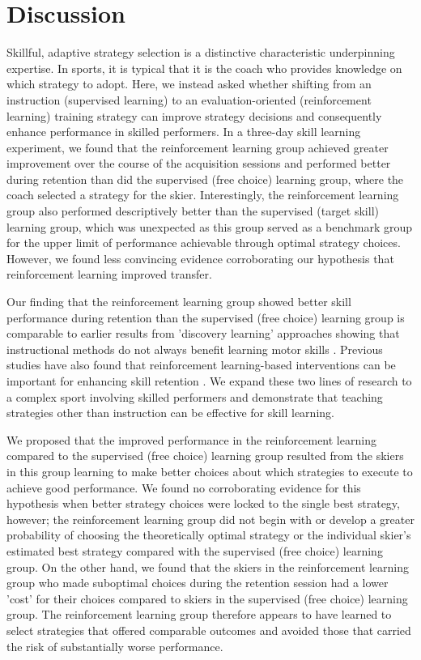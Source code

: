 \documentclass[pdflatex,sn-nature]{sn-jnl}%
\theoremstyle{thmstyleone}%
\theoremstyle{thmstyletwo}%
\theoremstyle{thmstylethree}%
\begin{document}
\section{Discussion}
Skillful, adaptive strategy selection is a distinctive characteristic underpinning expertise. In sports, it is typical that it is the coach who provides knowledge on which strategy to adopt. Here, we instead asked whether shifting from an instruction (supervised learning) to an evaluation-oriented (reinforcement learning) training strategy can improve strategy decisions and consequently enhance performance in skilled performers. In a three-day skill learning experiment, we found that the reinforcement learning group achieved greater improvement over the course of the acquisition sessions and performed better during retention than did the supervised (free choice) learning group, where the coach selected a strategy for the skier. Interestingly, the reinforcement learning group also performed descriptively better than the supervised (target skill) learning group, which was unexpected as this group served as a benchmark group for the upper limit of performance achievable through optimal strategy choices. However, we found less convincing evidence corroborating our hypothesis that reinforcement learning improved transfer.

Our finding that the reinforcement learning group showed better skill performance during retention than the supervised (free choice) learning group is comparable to earlier results from 'discovery learning' approaches showing that instructional methods do not always benefit learning motor skills \cite{wulf_instructions_1997, hodges_learning_2001, hodges_role_1999, vereijken_defence_1990}. Previous studies have also found that reinforcement learning-based interventions can be important for enhancing skill retention \cite{therrien_effective_2016, truong_error-based_2023, hasson_reinforcement_2015, lior_shmuelof_overcoming_2012}. We expand these two lines of research to a complex sport involving skilled performers and demonstrate that teaching strategies other than instruction can be effective for skill learning. 

We proposed that the improved performance in the reinforcement learning compared to the supervised (free choice) learning group resulted from the skiers in this group learning to make better choices about which strategies to execute to achieve good performance. We found no corroborating evidence for this hypothesis when better strategy choices were locked to the single best strategy, however; the reinforcement learning group did not begin with or develop a greater probability of choosing the theoretically optimal strategy or the individual skier's estimated best strategy compared with the supervised (free choice) learning group. On the other hand, we found that the skiers in the reinforcement learning group who made suboptimal choices during the retention session had a lower 'cost' for their choices compared to skiers in the supervised (free choice) learning group. The reinforcement learning group therefore appears to have learned to select strategies that offered comparable outcomes and avoided those that carried the risk of substantially worse performance. 
\end{document}
